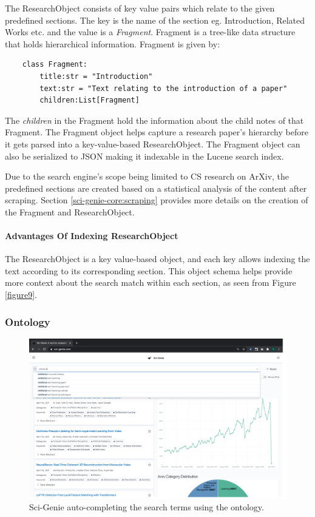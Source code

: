 The ResearchObject consists of key value pairs which relate to the given predefined sections. The key is the name of the section eg. Introduction, Related Works etc. and the value is a \textit{Fragment}. 
Fragment is a tree-like data structure that holds hierarchical information. Fragment is given by:
\begin{verbatim}
    class Fragment:
        title:str = "Introduction"
        text:str = "Text relating to the introduction of a paper"
        children:List[Fragment] 
\end{verbatim}    

The \textit{children} in the Fragment hold the information about the child notes of that Fragment. The Fragment object helps capture a research paper’s hierarchy before it gets parsed into a key-value-based ResearchObject. The Fragment object can also be serialized to JSON making it indexable in the Lucene search index.  

Due to the search engine’s scope being limited to CS research on ArXiv, the predefined sections are created based on a statistical analysis of the content after scraping. Section \ref{sci-genie-core:scraping} provides more details on the creation of the Fragment and ResearchObject. 

\paragraph{Advantages Of Indexing ResearchObject}
The ResearchObject is a key value-based object, and each key allows indexing the text according to its corresponding section. This object schema helps provide more context about the search match within each section, as seen from Figure \ref{figure9}. 

\subsubsection{Ontology}
\begin{figure}[h]
    \centering
    \includegraphics[width=\maxwidth{\textwidth}]{src/images/sci-genie-autocomp-example.png}
    \caption{Sci-Genie auto-completing the search terms using the ontology. }
    \label{figure\arabic{figurecounter}}
\end{figure}

